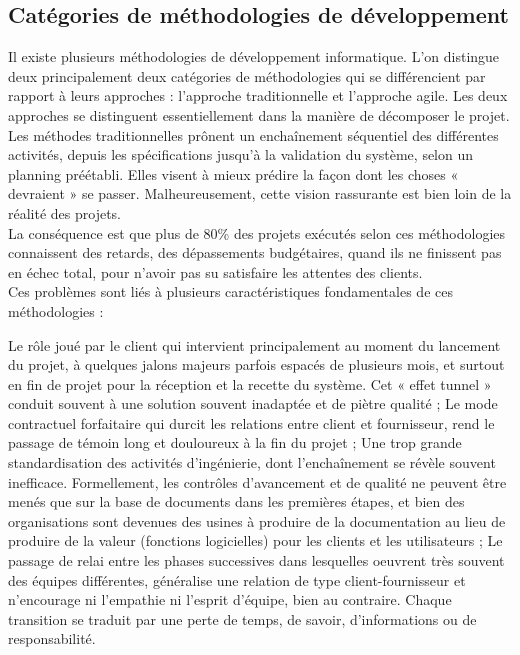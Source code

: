 \subsection{Catégories de méthodologies de développement}
Il existe plusieurs méthodologies de développement informatique. L’on distingue deux principalement
deux catégories de méthodologies qui se différencient par rapport à leurs approches : l’approche traditionnelle et l’approche agile. Les deux approches se distinguent essentiellement dans la manière de décomposer le projet.\\
Les méthodes traditionnelles prônent un enchaînement séquentiel des différentes activités, depuis les spécifications jusqu'à la validation du système, selon un planning préétabli. Elles visent à mieux prédire la façon dont les choses « devraient » se passer. Malheureusement, cette vision rassurante est bien loin de la réalité des projets.\\
La conséquence est que plus de 80\% des projets exécutés selon ces méthodologies connaissent des retards, des dépassements budgétaires, quand ils ne finissent pas en échec total, pour n’avoir pas su satisfaire les attentes des clients.\\
Ces problèmes sont liés à plusieurs caractéristiques fondamentales de ces méthodologies :
\begin{itemize}
	\itemtirait Le rôle joué par le client qui intervient principalement au moment du lancement du projet, à quelques jalons majeurs parfois espacés de plusieurs mois, et surtout en fin de projet pour la réception et la recette du système. Cet « effet tunnel » conduit souvent à une solution souvent inadaptée et de piètre qualité ;
	\itemtirait Le mode contractuel forfaitaire qui durcit les relations entre client et fournisseur, rend le passage de témoin long et douloureux à la fin du projet ;
	\itemtirait Une trop grande standardisation des activités d’ingénierie, dont l’enchaînement se révèle souvent inefficace. Formellement, les contrôles d'avancement et de qualité ne peuvent être menés que sur la base de documents dans les premières étapes, et bien des organisations sont devenues des usines à produire de la documentation au lieu de produire de la valeur (fonctions logicielles) pour les clients et les utilisateurs ;
	\itemtirait Le passage de relai entre les phases successives dans lesquelles oeuvrent très souvent des équipes différentes, généralise une relation de type client-fournisseur et n’encourage ni l’empathie ni l’esprit d’équipe, bien au contraire. Chaque transition se traduit par une perte de temps, de savoir, d’informations ou de responsabilité.
\end{itemize}
